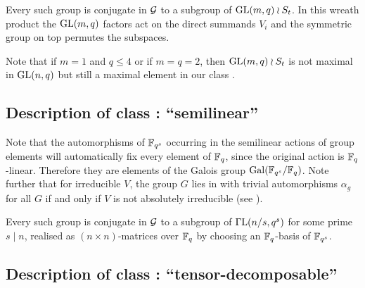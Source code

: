 \stru
Every such group is conjugate in $\mathcal{G}$ to a subgroup of $\GL(m,q) \wr S_t$.
In this wreath product the $\GL(m,q)$ factors act on the direct summands
$V_i$ and the symmetric group on top permutes the subspaces.

Note that if $m = 1$ and $q \le 4$ or if $m=q=2$, then $\GL(m,q) \wr S_t$
is not maximal in $\GL(n,q)$ but still a maximal element in our class
.

\subsection{Description of class : ``semilinear''}
\label{descC3}


Note that the automorphisms of $\mathbb{F}_{q^s}$ occurring in the semilinear
actions of group elements will automatically fix every element of $\mathbb{F}_q$, 
since the original action is $\mathbb{F}_q$-linear. Therefore they are elements of
the Galois group $\Gal(\F_{q^s}/\F_q)$. Note further that for irreducible
$V$, the group $G$ lies in  
with trivial automorphisms $\alpha_g$ for all $G$ if and only if
$V$ is not absolutely irreducible (see \cite[(29.13)]{CR0}).

\medskip
\stru
Every such group is conjugate in $\mathcal{G}$ to a subgroup of $\GGL(n/s,q^s)$
for some prime $s \mid n$, 
realised as $(n \times n)$-matrices over $\mathbb{F}_q$ by choosing an 
$\mathbb{F}_q$-basis of $\mathbb{F}_{q^s}$.

\subsection{Description of class : ``tensor-decomposable''}
\label{descC4}



